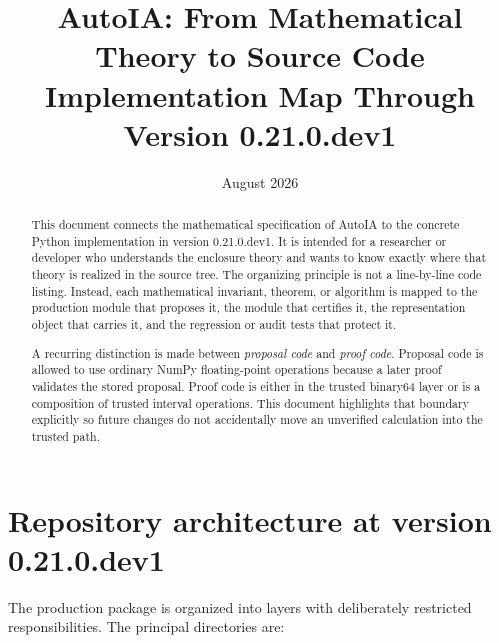 \documentclass[11pt]{article}
\title{\textbf{AutoIA: From Mathematical Theory to Source Code}\\
Implementation Map Through Version 0.21.0.dev1}
\author{}
\date{August 2026}
\begin{document}
\maketitle

\begin{abstract}
This document connects the mathematical specification of AutoIA to the concrete
Python implementation in version 0.21.0.dev1.  It is intended for a researcher or
developer who understands the enclosure theory and wants to know exactly where
that theory is realized in the source tree.  The organizing principle is not a
line-by-line code listing.  Instead, each mathematical invariant, theorem, or
algorithm is mapped to the production module that proposes it, the module that
certifies it, the representation object that carries it, and the regression or
audit tests that protect it.

A recurring distinction is made between \emph{proposal code} and \emph{proof
code}.  Proposal code is allowed to use ordinary NumPy floating-point operations
because a later proof validates the stored proposal.  Proof code is either in the
trusted binary64 layer or is a composition of trusted interval operations.  This
document highlights that boundary explicitly so future changes do not accidentally
move an unverified calculation into the trusted path.
\end{abstract}

\tableofcontents
\newpage

\section{Repository architecture at version 0.21.0.dev1}

The production package is organized into layers with deliberately restricted
responsibilities.  The principal directories are:
\end{document}
